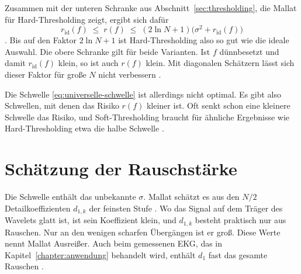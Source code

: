 \documentclass[a4paper,11pt,bibliography=totoc,listof=totoc,headinclude=true,cleardoublepage=empty,oneside]{scrbook}
\theoremstyle{plain}
\theoremstyle{definition}
\begin{document}
Zusammen mit der unteren Schranke aus Abschnitt~\ref{sec:thresholding}, die
Mallat für Hard-Thresholding zeigt, ergibt sich dafür
\[
  r_{\mathrm{id}}(f) \;\le\; r(f) \;\le\; (2\ln N + 1)\bigl(\sigma^2 + r_{\mathrm{id}}(f)\bigr)
\]
\cite[Kap.~11.2.2]{mallat}. %
Bis auf den Faktor $2\ln N + 1$ ist Hard-Thresholding also so gut wie die ideale
Auswahl. Die obere Schranke gilt für beide Varianten. Ist $f$ dünnbesetzt und
damit $r_{\mathrm{id}}(f)$ klein, so ist auch $r(f)$ klein. Mit diagonalen
Schätzern lässt sich dieser Faktor für gro\ss e $N$ nicht verbessern
\cite[Gl.~(11.52)]{mallat}. %
 
 
Die Schwelle \eqref{eq:universelle-schwelle} ist allerdings nicht optimal. Es
gibt also Schwellen, mit denen das Risiko $r(f)$ kleiner ist. Oft senkt schon
eine kleinere Schwelle das Risiko, und Soft-Thresholding braucht für ähnliche
Ergebnisse wie Hard-Thresholding etwa die halbe Schwelle
\cite[Kap.~11.2.2]{mallat}. %
 
\section{Schätzung der Rauschstärke}
\label{sec:mad}
 
Die Schwelle enthält das unbekannte $\sigma$. Mallat schätzt es aus den $N/2$
Detailkoeffizienten $d_{1,k}$ der feinsten Stufe \cite[Kap.~11.3.1]{mallat}. %
Wo das Signal auf dem Träger des Wavelets glatt ist, ist sein Koeffizient
klein, und $d_{1,k}$ besteht praktisch nur aus Rauschen. Nur an den wenigen
scharfen Übergängen ist er gro\ss. Diese Werte nennt Mallat Ausrei\ss er. Auch
beim gemessenen EKG, das in Kapitel~\ref{chapter:anwendung} behandelt wird,
enthält $d_1$ fast das gesamte Rauschen \cite[Kap.~3.1.2]{lmr}. %
 
\end{document}

